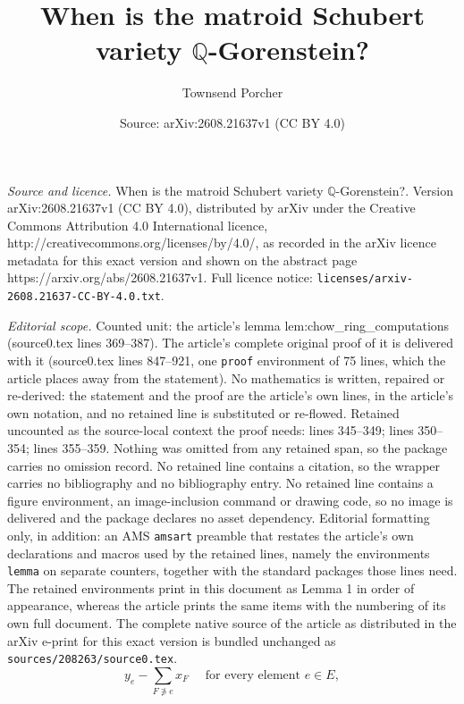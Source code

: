 \documentclass[10pt,a4paper]{amsart}
\title{When is the matroid Schubert variety $\mathbb{Q}$-Gorenstein?}
\author{Townsend Porcher}
\date{Source: arXiv:2608.21637v1 (CC BY 4.0)}
\begin{document}
\maketitle

\noindent\emph{Source and licence.} When is the matroid Schubert variety $\mathbb{Q}$-Gorenstein?. Version arXiv:2608.21637v1 (CC BY 4.0), distributed by arXiv under the Creative Commons Attribution 4.0 International licence, http://creativecommons.org/licenses/by/4.0/, as recorded in the arXiv licence metadata for this exact version and shown on the abstract page https://arxiv.org/abs/2608.21637v1. Full licence notice: \texttt{licenses/arxiv-2608.21637-CC-BY-4.0.txt}.\par\smallskip

\noindent\textit{Editorial scope.} Counted unit: the article's lemma lem:chow\_ring\_computations (source0.tex lines 369--387). The article's complete original proof of it is delivered with it (source0.tex lines 847--921, one \texttt{proof} environment of 75 lines, which the article places away from the statement). No mathematics is written, repaired or re-derived: the statement and the proof are the article's own lines, in the article's own notation, and no retained line is substituted or re-flowed.  Retained uncounted as the source-local context the proof needs: lines 345--349; lines 350--354; lines 355--359.  Nothing was omitted from any retained span, so the package carries no omission record.  No retained line contains a citation, so the wrapper carries no bibliography and no bibliography entry.  No retained line contains a figure environment, an image-inclusion command or drawing code, so no image is delivered and the package declares no asset dependency.  Editorial formatting only, in addition: an AMS \texttt{amsart} preamble that restates the article's own declarations and macros used by the retained lines, namely the environments \texttt{lemma} on separate counters, together with the standard packages those lines need.  The retained environments print in this document as Lemma 1 in order of appearance, whereas the article prints the same items with the numbering of its own full document.  The complete native source of the article as distributed in the arXiv e-print for this exact version is bundled unchanged as \texttt{sources/208263/source0.tex}.
\begin{equation}
\label{eq:ideal_description_1}
\tag{R1}
y_e - \sum_{F\not\ni e} x_F \quad \text{ for every element } e \in E,
\end{equation}
\end{document}

